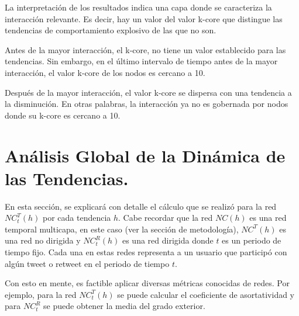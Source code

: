 \documentclass[../main.tex]{subfiles}
\begin{document}
La interpretación de los resultados indica una capa donde se caracteriza la interacción relevante. Es decir, hay un valor del valor k-core que distingue las tendencias de comportamiento explosivo de las que no son. 

Antes de la mayor interacción, el k-core, no tiene un valor establecido para las tendencias. Sin embargo, en el último intervalo de tiempo antes de la mayor interacción, el valor k-core de los nodos es cercano a 10.

Después de la mayor interacción, el valor k-core se dispersa con una tendencia a la disminución. En otras palabras, la interacción ya no es gobernada por nodos donde su k-core es cercano a 10.















\section{Análisis Global de la Dinámica de las Tendencias.}


En esta sección, se explicará con detalle el cálculo que se realizó para la red $NC_{t}^{T}(h)$ por cada tendencia $h$. Cabe recordar que la red $NC(h)$ es una red temporal multicapa, en este caso (ver la sección de metodología),  $NC^{T}(h)$ es una red no dirigida y $NC_{t}^{R}(h)$ es una red dirigida donde $t$ es un periodo de tiempo fijo. Cada una en estas redes representa a un usuario que participó con algún tweet o retweet en el periodo de tiempo $t$.

Con esto en mente, es factible aplicar diversas métricas conocidas de redes. Por ejemplo, para la red $NC_{t}^{T}(h)$ se puede calcular el coeficiente de asortatividad y para $NC_{t}^{R}$ se puede obtener la media del grado exterior. 
\end{document}

